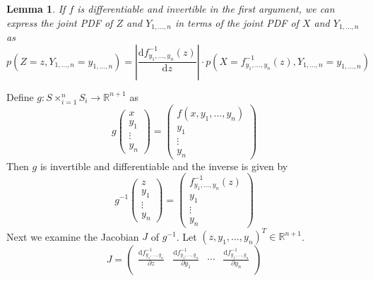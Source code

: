 \documentclass[11pt,a4paper]{book}
\newtheorem{lemma}{Lemma}
\begin{document}
\begin{lemma}
  \label{lemma:joint-pdf}
  If $f$ is differentiable and invertible in the first argument, we can express
  the joint PDF of $Z$ and $Y_{1, \dots, n}$ in terms of the joint PDF of $X$
  and $Y_{1, \dots, n}$ as
  \begin{equation*}
    p(Z = z, Y_{1, \dots, n} = y_{1, \dots, n}) = \left| \frac{\mathrm{d}f_{y_{1}, \dots, y_{n}}^{-1}(z)}{\mathrm{d}z} \right| \cdot p\left(X = f_{y_{1}, \dots, y_{n}}^{-1}(z), Y_{1, \dots, n} = y_{1, \dots, n}\right)
  \end{equation*}
\end{lemma}
\begin{proof2}
  Define $g : S \times_{i = 1}^{n} S_{i} \rightarrow \mathbb{R}^{n + 1}$ as
  \begin{equation*}
    g \begin{pmatrix}
      x\\y_{1}\\\vdots\\y_{n}
    \end{pmatrix} = \begin{pmatrix}
      f(x, y_{1}, \dots, y_{n})\\
      y_{1}\\\vdots\\y_{n}
    \end{pmatrix}
  \end{equation*}
  Then $g$ is invertible and differentiable and the inverse is given by
  \begin{equation*}
    g^{-1}\begin{pmatrix}
      z\\y_{1}\\\vdots\\y_{n}
    \end{pmatrix} = \begin{pmatrix}
      f_{y_{1}, \dots, y_{n}}^{-1}(z)\\
      y_{1}\\\vdots\\y_{n}
    \end{pmatrix}
  \end{equation*}
  Next we examine the Jacobian $J$ of $g^{-1}$. Let
  $(z, y_{1}, \dots, y_{n})^{T} \in \mathbb{R}^{n + 1}$.
  \begin{equation*}
    J =
    \begin{pmatrix}
      \frac{\mathrm{d}f_{y_{1}, \dots, y_{n}}^{-1}}{\partial z} & \frac{\mathrm{d}f_{y_{1}, \dots, y_{n}}^{-1}}{\partial y_{1}} & \cdots & \frac{\mathrm{d}f_{y_{1}, \dots, y_{n}}^{-1}}{\partial y_{n}}\\

\end{pmatrix}
\end{equation*}
\end{proof2}
\end{document}
